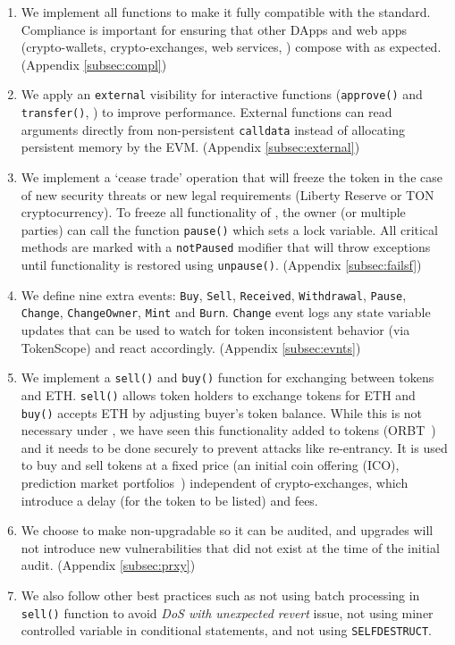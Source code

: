 \begin{enumerate}[noitemsep,topsep=0pt]
	\item We implement all \erc functions to make it fully compatible with the standard. Compliance is important for ensuring that other DApps and web apps (\ie crypto-wallets, crypto-exchanges, web services, \etc) compose with \sys as expected. (\cf Appendix \ref{subsec:compl})

	\item We apply an \texttt{external} visibility for interactive functions (\eg \texttt{approve()} and \texttt{transfer()}, \etc) to improve performance.  External functions can read arguments directly from non-persistent \texttt{calldata} instead of allocating persistent memory by the EVM. (\cf Appendix \ref{subsec:external})

	\item We implement a `cease trade' operation that will freeze the token in the case of new security threats or new legal requirements (\eg Liberty Reserve \cite{LibertyReserve} or TON cryptocurrency\cite{TON}). To freeze all functionality of \sys, the owner (or multiple parties) can call the function \texttt{pause()} which sets a lock variable. All critical methods are marked with a \texttt{notPaused} modifier that will throw exceptions until functionality is restored using \texttt{unpause()}. (\cf Appendix \ref{subsec:failsf})

	\item We define nine extra events: \texttt{Buy}, \texttt{Sell}, \texttt{Received}, \texttt{Withdrawal}, \texttt{Pause}, \texttt{Change}, \texttt{ChangeOwner}, \texttt{Mint} and \texttt{Burn}. \texttt{Change} event logs any state variable updates that can be used to watch for token inconsistent behavior (\eg via TokenScope\cite{TokenScope}) and react accordingly. (\cf Appendix \ref{subsec:evnts})
	
	\item We implement a \texttt{sell()} and \texttt{buy()} function for exchanging between tokens and ETH. \texttt{sell()} allows token holders to exchange tokens for ETH and \texttt{buy()} accepts ETH by adjusting buyer's token balance. While this is not necessary under \erc, we have seen this functionality added to tokens (\eg ORBT~\cite{ORBTToken}) and it needs to be done securely to prevent attacks like re-entrancy. It is used to buy and sell tokens at a fixed price (\eg an initial coin offering (ICO), prediction market portfolios~\cite{CBN+14}) independent of crypto-exchanges, which introduce a delay (for the token to be listed) and fees.
	
	\item We choose to make \sys non-upgradable so it can be audited, and upgrades will not introduce new vulnerabilities that did not exist at the time of the initial audit. (\cf Appendix \ref{subsec:prxy})
	
	\item We also follow other best practices such as not using batch processing in \texttt{sell()} function to avoid \textit{DoS with unexpected revert} issue, not using miner controlled variable in conditional statements, and not using \texttt{SELFDESTRUCT}.
	
\end{enumerate}
